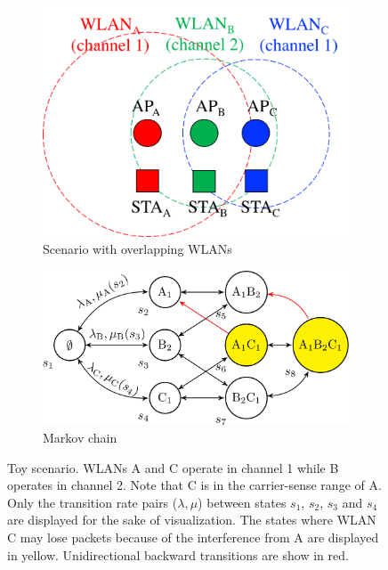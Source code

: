 \documentclass[preprint,12pt]{elsarticle}
\begin{document}
\begin{figure}[h!]
	\centering		
	\begin{subfigure}[b]{0.35\textwidth}
		\includegraphics[width=\textwidth]{three_wlans_ctmn_a}
		\caption{Scenario with overlapping WLANs}\label{fig:three_wlans_ctmn_a}
	\end{subfigure}
	\begin{subfigure}[b]{0.5\textwidth}
		\includegraphics[width=\textwidth]{three_wlans_ctmn_b}
		\caption{Markov chain}\label{fig:three_wlans_ctmn_b}
	\end{subfigure}
	\caption{Toy scenario. WLANs A and C operate in channel 1 while B operates in channel 2. Note that C is in the carrier-sense range of A. Only the transition rate pairs ($\lambda, \mu$) between states $s_1$, $s_2$, $s_3$ and $s_4$ are displayed for the sake of visualization. The states where WLAN C may lose packets because of the interference from A are displayed in yellow. Unidirectional backward transitions are show in red.}    
	\label{fig:three_wlans_ctmn}
\end{figure}
\end{document}
